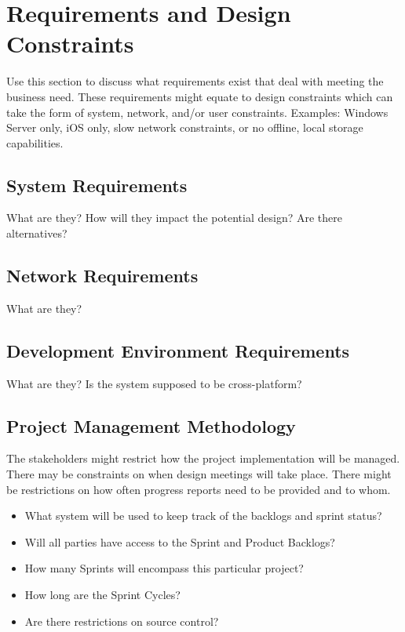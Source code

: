 \section{Requirements and Design Constraints}
Use this section to discuss what requirements exist that deal with meeting the 
business need.  These requirements might equate to design constraints which can 
take the form of system, network, and/or user constraints.  Examples:  Windows 
Server only, iOS only, slow network constraints, or no offline, local storage capabilities. 


\subsection{System  Requirements}
What are they?  How will they impact the potential design?  Are there alternatives? 


\subsection{Network Requirements}
What are they? 


\subsection{Development Environment Requirements}
What are they?  Is the system supposed to be cross-platform? 


\subsection{Project  Management Methodology}
The stakeholders might restrict how the project implementation will be managed. 
 There may be constraints on when design meetings will take place.  There might 
be restrictions on how often progress reports need to be provided and to whom. 
 
\begin{itemize}
\item What system will be used to keep track of the backlogs and sprint status?
\item Will all parties have access to the Sprint and Product Backlogs?
\item How many Sprints will encompass this particular project?
\item How long are the Sprint Cycles?
\item Are there restrictions on source control? 
\end{itemize}

